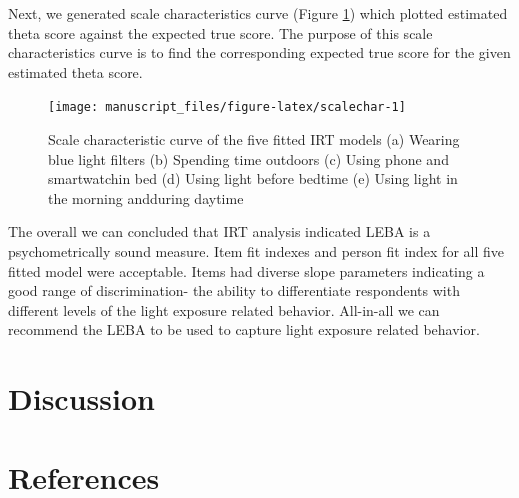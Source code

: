 \documentclass[
  english,
  man]{apa6}
\begin{document}
Next, we generated scale characteristics curve (Figure \ref{fig:scalechar}) which plotted estimated theta score against the expected true score. The purpose of this scale characteristics curve is to find the corresponding expected true score for the given estimated theta score.

\begin{figure}
\texttt{[image: manuscript\_files/figure-latex/scalechar-1]} \caption{Scale characteristic curve of the five fitted IRT models (a) Wearing blue light filters (b) Spending time outdoors (c) Using phone and smartwatchin bed (d) Using light before bedtime (e) Using light in the morning andduring daytime}\label{fig:scalechar}
\end{figure}

The overall we can concluded that IRT analysis indicated LEBA is a psychometrically sound measure. Item fit indexes and person fit index for all five fitted model were acceptable. Items had diverse slope parameters indicating a good range of discrimination- the ability to differentiate respondents with different levels of the light exposure related behavior. All-in-all we can recommend the LEBA to be used to capture light exposure related behavior.

\hypertarget{discussion}{%
\section{Discussion}\label{discussion}}

\newpage

\hypertarget{references}{%
\section{References}\label{references}}

\begingroup
\setlength{\parindent}{-0.5in}
\setlength{\leftskip}{0.5in}
\end{document}
